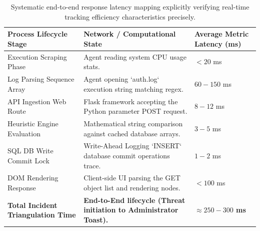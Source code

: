 \begin{table}[h]
\centering
\small
\begin{tabularx}{\textwidth}{|X|X|X|}
\hline
\textbf{Process Lifecycle Stage} & \textbf{Network / Computational State} & \textbf{Average Metric Latency (ms)} \\ \hline
Execution Scraping Phase & Agent reading system CPU usage stats. & $< 20$ ms \\ \hline
Log Parsing Sequence Array & Agent opening `auth.log` execution string matching regex. & $60 - 150$ ms \\ \hline
API Ingestion Web Route & Flask framework accepting the Python parameter POST request. & $8 - 12$ ms \\ \hline
Heuristic Engine Evaluation & Mathematical string comparison against cached database arrays. & $3 - 5$ ms \\ \hline
SQL DB Write Commit Lock & Write-Ahead Logging `INSERT` database commit operations trace. & $1 - 2$ ms \\ \hline
DOM Rendering Response & Client-side UI parsing the GET object list and rendering nodes. & $< 100$ ms \\ \hline
\textbf{Total Incident Triangulation Time} & \textbf{End-to-End lifecycle (Threat initiation to Administrator Toast).} & \textbf{$\approx 250 - 300$ ms} \\ \hline
\end{tabularx}
\caption{Systematic end-to-end response latency mapping explicitly verifying real-time tracking efficiency characteristics precisely.}
\label{tab:performance_lat}
\end{table}

